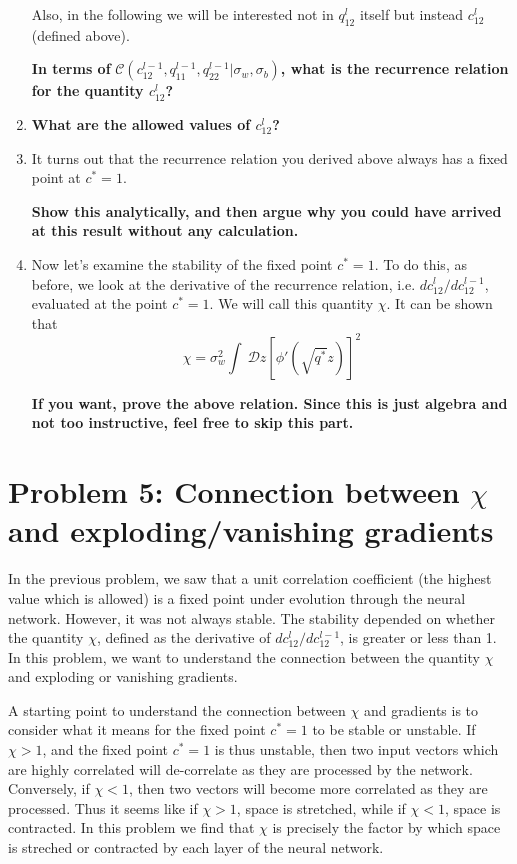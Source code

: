 \documentclass[a4paper]{article}
\begin{document}
\begin{enumerate}[label=(\alph*)]
Also, in the following we will be interested not in $q_{12}^l$ itself but instead $c_{12}^l$ (defined above).

\textbf{In terms of} $\mathcal{C}\left(c_{12}^{l-1}, q_{11}^{l-1}, q_{22}^{l-1} | \sigma_{w}, \sigma_{b}\right)$\textbf{, what is the recurrence relation for the quantity $c_{12}^l$?}

\item \textbf{What are the allowed values of $c_{12}^l$?}

\item It turns out that the recurrence relation you derived above always has a fixed point at $c^* = 1$.  

\textbf{Show this analytically, and then argue why you could have arrived at this result without any calculation.}

\item Now let's examine the stability of the fixed point $c^* = 1$.  To do this, as before, we look at the derivative of the recurrence relation, i.e. $dc^l_{12}/dc^{l-1}_{12}$, evaluated at the point $c^* = 1$.  We will call this quantity $\chi$.  It can be shown that 
\begin{equation}
    \chi = \sigma_w^2 \int~\mathcal{D}z \left[\phi'(\sqrt{q^*} z)\right]^2
\end{equation}

\textbf{If you want, prove the above relation.  Since this is just algebra and not too instructive, feel free to skip this part. }

\end{enumerate}

\section*{Problem 5: Connection between $\chi$ and exploding/vanishing gradients}

In the previous problem, we saw that a unit correlation coefficient (the highest value which is allowed) is a fixed point under evolution through the neural network.  However, it was not always stable.  The stability depended on whether the quantity $\chi$, defined as the derivative of $dc_{12}^l/dc^{l-1}_{12}$, is greater or less than 1.  In this problem, we want to understand the connection between the quantity $\chi$ and exploding or vanishing gradients.  

A starting point to understand the connection between $\chi$ and gradients is to consider what it means for the fixed point $c^*=1$ to be stable or unstable.  If $\chi > 1$, and the fixed point $c^* = 1$ is thus unstable, then two input vectors which are highly correlated will de-correlate as they are processed by the network.  Conversely, if $\chi < 1$, then two vectors will become more correlated as they are processed.  Thus it seems like if $\chi > 1$, space is stretched, while if $\chi < 1$, space is contracted.  In this problem we find that $\chi$ is precisely the factor by which space is streched or contracted by each layer of the neural network.
\end{document}
